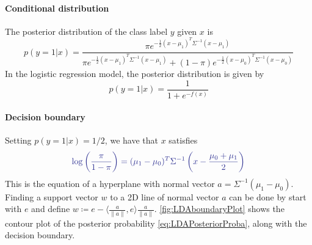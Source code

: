 \documentclass[11pt]{article}
\begin{document}
\paragraph{Conditional distribution} The posterior distribution of the class label $y$ given $x$ is
\begin{equation}\label{eq:LDAPosteriorProba}
p(y=1|x) =
\frac{
	\pi e^{-\frac{1}{2}(x-\mu_1)^T\Sigma^{-1}(x-\mu_1)}
}{
	\pi e^{-\frac{1}{2}(x-\mu_1)^T\Sigma^{-1}(x-\mu_1)} +
	(1-\pi) e^{-\frac{1}{2}(x-\mu_0)^T\Sigma^{-1}(x-\mu_0)}
}
\end{equation}
In the logistic regression model, the posterior distribution is given by
\[
	p(y=1|x) =
	\frac{1}{1 + e^{-f(x)}}
\]


\paragraph{Decision boundary} Setting $p(y=1|x) = 1/2$, we have that $x$ satisfies
\begin{equation}\label{eq:LDADecisionBoundaryEqn}
{\color{Blue}
	\log\left(\frac{\pi}{1-\pi}\right) =
	(\mu_1 - \mu_0)^T\Sigma^{-1}\left(x - \frac{\mu_0+\mu_1}{2}\right)
}
\end{equation}
This is the equation of a hyperplane with normal vector $a = \Sigma^{-1}(\mu_1 - \mu_0)$. Finding a support vector $w$ to a 2D line of normal vector $a$ can be done by start with $e$ and define $w\coloneqq e - \langle \frac{a}{\|a\|}, e\rangle \frac{a}{\|a\|}$. \autoref{fig:LDAboundaryPlot} shows the contour plot of the posterior probability \eqref{eq:LDAPosteriorProba}, along with the decision boundary.
\end{document}

